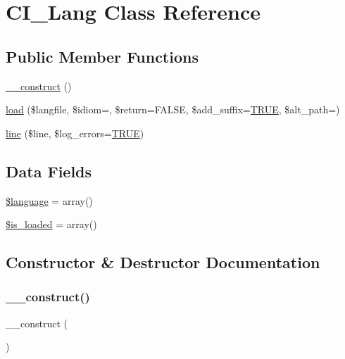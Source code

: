 \hypertarget{class_c_i___lang}{}\section{C\+I\+\_\+\+Lang Class Reference}
\label{class_c_i___lang}
\subsection*{Public Member Functions}
\begin{DoxyCompactItemize}
\item 
\mbox{\hyperlink{class_c_i___lang_a095c5d389db211932136b53f25f39685}{\+\_\+\+\_\+construct}} ()
\item 
\mbox{\hyperlink{class_c_i___lang_a38b49b0297816c583824cefbc30d0217}{load}} (\$langfile, \$idiom=\textquotesingle{}\textquotesingle{}, \$return=F\+A\+L\+SE, \$add\+\_\+suffix=\mbox{\hyperlink{constants_8php_ae04a3efe6aa42044f803ee90c2277846}{T\+R\+UE}}, \$alt\+\_\+path=\textquotesingle{}\textquotesingle{})
\item 
\mbox{\hyperlink{class_c_i___lang_a60a06468111224f49dd5cd51e5dc1410}{line}} (\$line, \$log\+\_\+errors=\mbox{\hyperlink{constants_8php_ae04a3efe6aa42044f803ee90c2277846}{T\+R\+UE}})
\end{DoxyCompactItemize}
\subsection*{Data Fields}
\begin{DoxyCompactItemize}
\item 
\mbox{\hyperlink{class_c_i___lang_a83170d318260a5a2e2a79dccdd371b10}{\$language}} = array()
\item 
\mbox{\hyperlink{class_c_i___lang_a908e9ad52a5d1956d360689452f6bdbe}{\$is\+\_\+loaded}} = array()
\end{DoxyCompactItemize}


\subsection{Constructor \& Destructor Documentation}
\mbox{\label{class_c_i___lang_a095c5d389db211932136b53f25f39685}} 
\subsubsection{\texorpdfstring{\+\_\+\+\_\+construct()}{\_\_construct()}}
{\footnotesize\ttfamily \+\_\+\+\_\+construct (\begin{DoxyParamCaption}{ }\end{DoxyParamCaption})}

